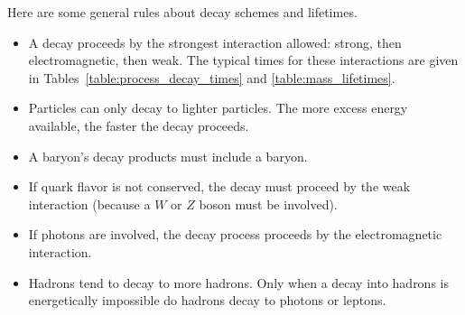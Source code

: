 Here are some general rules about decay schemes and lifetimes.
\begin{itemize}
\item A decay proceeds by the strongest interaction allowed:
  strong, then electromagnetic, then weak.  The typical times for these
  interactions are given in Tables~\ref{table:process_decay_times} and
  \ref{table:mass_lifetimes}.

\item Particles can only decay to lighter particles.  The more
  excess energy available, the faster the decay proceeds.

\item  A baryon's decay products must include a baryon.

\item If quark flavor is not conserved, the decay must proceed by the
  weak interaction (because a $W$ or $Z$ boson must be involved).

\item If photons are involved, the decay process proceeds by the
  electromagnetic interaction.

\item Hadrons tend to decay to more hadrons.  Only when a decay into
  hadrons is energetically impossible do hadrons decay to photons or
  leptons.

\end{itemize}

